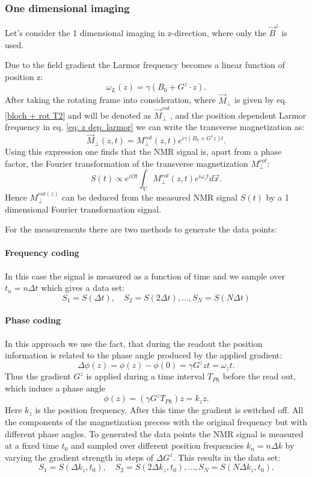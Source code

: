 \subsubsection{One dimensional imaging}
Let's consider the  1 dimensional imaging in z-direction, where only the $\vec{B}^z$ is used.  

Due to the field gradient the Larmor frequency becomes a linear function of position z:
\begin{equation}
\label{eq: z dep. larmor}
\omega_L(z) = \gamma(B_0 + G^z\cdot z).
\end{equation}
After taking the rotating frame into consideration, where $\vec{M}_\perp$ is given by eq. \ref{bloch + rot T2} and will be denoted as $\vec{M}_\perp^{rot}$, and the position dependent Larmor frequency in eq. \ref{eq: z dep. larmor} we can write the transverse magnetization as:
\begin{equation}
\vec{M}_\perp(z, t) = M_\perp^{rot}(z,t)e^{i\gamma(B_0 + G^{z}z)t}.
\end{equation}
Using this expression one finds that the NMR signal is, apart from a phase factor, the Fourier transformation of the transverse magnetization $M_\perp^{rot}$:
\begin{equation}
S(t)\propto e^{i\Omega t} \int_{V} M_\perp^{rot}(z,t) e^{i\omega_z t} d\vec{x}.
\end{equation}
Hence $M_\perp^{rot(z)}$ can be deduced from the measured NMR signal $S(t)$ by a 1 dimensional Fourier transformation signal.

For the measurements there are two methods to generate the data points:
\paragraph{Frequency coding}
In this case the signal is measured as a function of time and we sample over $t_n = n\Delta t$ which gives a data set:
$$S_1 = S(\Delta t), \quad S_2 = S(2\Delta t), ..., S_N = S(N\Delta t)$$
\paragraph{Phase coding}
In this approach we use the fact, that during the readout the position information is related to the phase angle produced by the applied gradient:
\begin{equation}
\Delta \phi(z)= \phi(z)-\phi(0) = \gamma G^z z t= \omega_z t.
\end{equation}
Thus the gradient  $G^z$ is applied during a time interval $T_{Ph}$ before the read out, which induce a phase angle \begin{equation}
\phi(z) = (\gamma G^z T_{Ph})z = k_z z.
\end{equation}
Here $k_z$ is the position frequency. After this time the gradient is switched off. All the components of the magnetization precess with the original frequency but with different phase angles.  
To generated the data points the NMR signal is measured at a fixed time $t_0$ and sampled over different position frequencies $k_n = n\Delta k$ by varying the gradient strength in steps of $\Delta G^z$.  This results in the data set: 
$$S_1 = S(\Delta k_z,t_0), \quad S_2 = S(2\Delta k_z, t_0), ..., S_N = S(N\Delta k_z, t_0).$$


